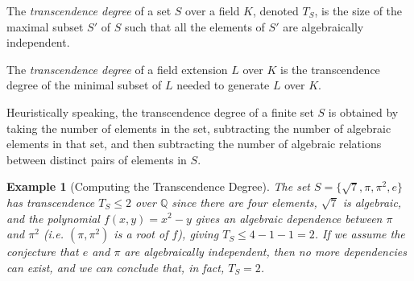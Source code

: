 \documentclass[12pt]{article}
\newtheorem{Exam}{Example}
\newcommand{\<}{\langle}
\renewcommand{\>}{\rangle}
\begin{document}
The \emph{transcendence degree} of a set $S$ over a field $K$, denoted $T_S$, is the size of the maximal subset $S'$ of $S$ such that all the elements of $S'$ are algebraically independent.

The \emph{transcendence degree} of a field extension $L$ over $K$ is the transcendence degree of the minimal subset of $L$ needed to generate $L$ over $K$.

Heuristically speaking, the transcendence degree of a finite set $S$ is obtained by taking the number of elements in the set, subtracting the number of algebraic elements in that set, and then subtracting the number of algebraic relations between distinct pairs of elements in $S$.

\begin{Exam}[Computing the Transcendence Degree]
The set $S=\{\sqrt{7}, \pi, \pi^2, e\}$ has transcendence $T_S\leq2$ over $\mathbb{Q}$ since there are
four elements, $\sqrt{7}$ is algebraic, and the polynomial
$f(x,y)=x^2-y$ gives an algebraic dependence between $\pi$ and $\pi^2$
(i.e.  $(\pi,\pi^2)$ is a root of $f$), giving $T_S\leq4-1-1=2$.  If
we assume the conjecture that $e$ and $\pi$ are algebraically
independent, then no more dependencies can exist, and we can conclude
that, in fact, $T_S=2$.
\end{Exam}
\end{document}
